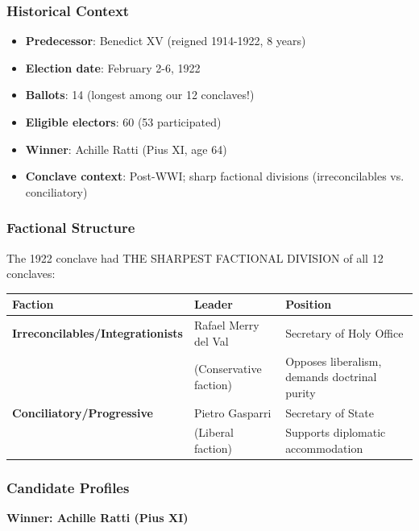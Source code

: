 \subsubsection{Historical Context}

\begin{itemize}
    \item \textbf{Predecessor}: Benedict XV (reigned 1914-1922, 8 years)
    \item \textbf{Election date}: February 2-6, 1922
    \item \textbf{Ballots}: 14 (longest among our 12 conclaves!)
    \item \textbf{Eligible electors}: 60 (53 participated)
    \item \textbf{Winner}: Achille Ratti (Pius XI, age 64)
    \item \textbf{Conclave context}: Post-WWI; sharp factional divisions (irreconcilables vs. conciliatory)
\end{itemize}

\subsubsection{Factional Structure}

The 1922 conclave had THE SHARPEST FACTIONAL DIVISION of all 12 conclaves:

\begin{center}
\begin{tabular}{lll}
\toprule
\textbf{Faction} & \textbf{Leader} & \textbf{Position} \\
\midrule
\textbf{Irreconcilables/Integrationists} & Rafael Merry del Val & Secretary of Holy Office \\
& (Conservative faction) & Opposes liberalism, demands doctrinal purity \\
\midrule
\textbf{Conciliatory/Progressive} & Pietro Gasparri & Secretary of State \\
& (Liberal faction) & Supports diplomatic accommodation \\
\bottomrule
\end{tabular}
\end{center}

\subsubsection{Candidate Profiles}

\textbf{Winner: Achille Ratti (Pius XI)}

